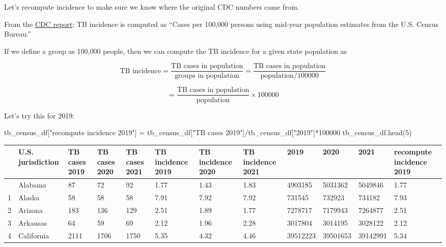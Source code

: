 \documentclass[
  letterpaper,
  DIV=11,
  numbers=noendperiod]{scrreprt}
\newenvironment{Shaded}{\begin{snugshade}}{\end{snugshade}}
\newcommand{\DecValTok}[1]{\textcolor[rgb]{0.68,0.00,0.00}{#1}}
\newcommand{\NormalTok}[1]{\textcolor[rgb]{0.00,0.23,0.31}{#1}}
\newcommand{\OperatorTok}[1]{\textcolor[rgb]{0.37,0.37,0.37}{#1}}
\newcommand{\StringTok}[1]{\textcolor[rgb]{0.13,0.47,0.30}{#1}}
\begin{document}
Let's recompute incidence to make sure we know where the original CDC
numbers came from.

From the
\href{https://www.cdc.gov/mmwr/volumes/71/wr/mm7112a1.htm?s_cid=mm7112a1_w\#T1_down}{CDC
report}: TB incidence is computed as ``Cases per 100,000 persons using
mid-year population estimates from the U.S. Census Bureau.''

If we define a group as 100,000 people, then we can compute the TB
incidence for a given state population as

\[\text{TB incidence} = \frac{\text{TB cases in population}}{\text{groups in population}} = \frac{\text{TB cases in population}}{\text{population}/100000} \]

\[= \frac{\text{TB cases in population}}{\text{population}} \times 100000\]

Let's try this for 2019:

\begin{Shaded}
\begin{Highlighting}[]
\NormalTok{tb\_census\_df[}\StringTok{"recompute incidence 2019"}\NormalTok{] }\OperatorTok{=}\NormalTok{ tb\_census\_df[}\StringTok{"TB cases 2019"}\NormalTok{]}\OperatorTok{/}\NormalTok{tb\_census\_df[}\StringTok{"2019"}\NormalTok{]}\OperatorTok{*}\DecValTok{100000}
\NormalTok{tb\_census\_df.head(}\DecValTok{5}\NormalTok{)}
\end{Highlighting}
\end{Shaded}

\begin{longtable}[]{@{}llllllllllll@{}}
\toprule\noalign{}
& U.S. jurisdiction & TB cases 2019 & TB cases 2020 & TB cases 2021 & TB
incidence 2019 & TB incidence 2020 & TB incidence 2021 & 2019 & 2020 &
2021 & recompute incidence 2019 \\
\midrule\noalign{}
\endhead
\bottomrule\noalign{}
\endlastfoot
0 & Alabama & 87 & 72 & 92 & 1.77 & 1.43 & 1.83 & 4903185 & 5031362 &
5049846 & 1.77 \\
1 & Alaska & 58 & 58 & 58 & 7.91 & 7.92 & 7.92 & 731545 & 732923 &
734182 & 7.93 \\
2 & Arizona & 183 & 136 & 129 & 2.51 & 1.89 & 1.77 & 7278717 & 7179943 &
7264877 & 2.51 \\
3 & Arkansas & 64 & 59 & 69 & 2.12 & 1.96 & 2.28 & 3017804 & 3014195 &
3028122 & 2.12 \\
4 & California & 2111 & 1706 & 1750 & 5.35 & 4.32 & 4.46 & 39512223 &
39501653 & 39142991 & 5.34 \\
\end{longtable}
\end{document}
